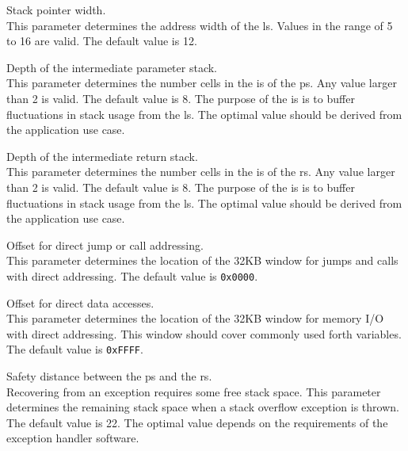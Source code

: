 \begin{description}[style=nextline]

\item[\texttt{SP\_WIDTH}] Stack pointer width. \\
  This parameter determines the address width of the \gls{ls}.
  Values in the range of 5 to 16 are valid.
  The default value is 12. 
  
\item[\texttt{IPS\_DEPTH}] Depth of the intermediate parameter stack. \\
  This parameter determines the number \glspl{cell} in the \gls{is} of the \gls{ps}.
  Any value larger than 2 is valid.
  The default value is 8. 
  The purpose of the \gls{is} is to buffer fluctuations in stack usage from the \gls{ls}.
  The optimal value should be derived from the application use case.

\item[\texttt{IRS\_DEPTH}] Depth of the intermediate return stack. \\
  This parameter determines the number \glspl{cell} in the \gls{is} of the \gls{rs}.
  Any value larger than 2 is valid.
  The default value is 8. 
  The purpose of the \gls{is} is to buffer fluctuations in stack usage from the \gls{ls}.
  The optimal value should be derived from the application use case.

\item[\texttt{PBUS\_AADR\_OFFSET}] Offset for direct \gls{jump} or \gls{call} addressing. \\
  This parameter determines the location of the 32KB window for \glspl{jump} and \glspl{call}
  with direct addressing.
  The default value is \texttt{0x0000}. 

\item[\texttt{PBUS\_MADR\_OFFSET}] Offset for direct data accesses. \\
  This parameter determines the location of the 32KB window for memory I/O with direct addressing.
  This window should cover commonly used \gls{forth} variables. The default value is \texttt{0xFFFF}. 

\item[\texttt{PS\_RS\_DIST}] Safety distance between the \gls{ps} and the \gls{rs}. \\
  Recovering from an exception requires some free \gls{stack} space.
  This parameter determines the remaining \gls{stack} space when a \gls{stack} overflow exception is thrown.
  The default value is 22. The optimal value depends on the requirements of the exception handler software.

\end{description}

